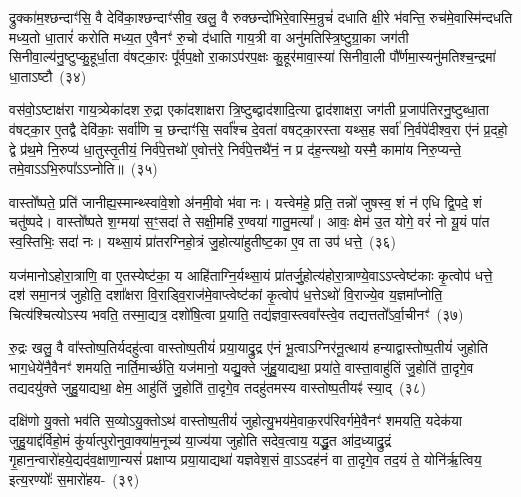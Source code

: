 द्रुक्का॑म॒श्छन्दाꣳ॑सि॒ वै देवि॑का॒श्छन्दाꣳ॑सीव॒ खलु॒ वै रुक्छन्दो॑भिरे॒वास्मि॒न्रुचं॑ दधाति क्षी॒रे भ॑वन्ति॒ रुच॑मे॒वास्मि॑न्दधति मध्य॒तो धा॒तारं॑ करोति मध्य॒त ए॒वैनꣳ॑ रु॒चो द॑धाति गाय॒त्री वा अनु॑मतिस्त्रि॒ष्टुग्रा॒का जग॑ती सिनीवा॒ल्य॑नु॒ष्टुप्कु॒हूर्धा॒ता व॑षट्का॒रः पू᳚र्वप॒क्षो रा॒का\-ऽप॑रप॒क्षः कु॒हूर॑मावा॒स्या॑ सिनीवा॒ली पौ᳚र्णमा॒स्यनु॑\-मतिश्च॒न्द्रमा॑ धा॒ता\-ऽष्टौ~(३४)

वस॑वो॒\-ऽष्टाक्ष॑रा गाय॒त्र्येका॑\-दश रु॒द्रा एका॑\-दशाक्षरा त्रि॒ष्टुब्द्वाद॑शादि॒त्या द्वाद॑शाक्षरा॒ जग॑ती प्र॒जा\-प॑तिरनु॒ष्टुब्धा॒ता व॑षट्का॒र ए॒तद्वै देवि॑काः॒ सर्वा॑णि च॒ छन्दाꣳ॑सि॒ सर्वा᳚श्च दे॒वता॑ वषट्का॒रस्ता यथ्स॒ह सर्वा॑ नि॒र्वपे॑दीश्व॒रा ए॑नं प्र॒दहो॒ द्वे प्र॑थ॒मे नि॒रुप्य॑ धा॒तुस्तृ॒तीयं॒ निर्व॑पे॒त्तथो॑ ए॒वोत्त॑रे॒ निर्व॑पे॒त्तथै॑नं॒ न प्र द॑ह॒न्त्यथो॒ यस्मै॒ कामा॑य निरु॒प्यन्ते॒ तमे॒वा\-ऽऽ\-भि॒रुपा᳚\-ऽऽ\-प्नोति॥~(३५)

{\anuvakamend[{प॒शुका॑म॒श्छन्दाꣳ॑सि॒ वै देवि॑का॒श्छन्दाꣳ॑सि॒ ग्राम॑ङ्कल्पयत्ये॒ता ए॒व निरु॑त्त॒मन्धा॒तारं॑ करोति मे॒धा न॑मत्ये॒ता ए॒व निर्व॑पेद॒ष्टौ द॑हन्ति॒ नव॑ च॥ देविकाः प्रजाकामो मिथुनी पशुकाम}]}

वास्तो᳚ष्पते॒ प्रति॑ जानीह्य॒स्मान्थ्\-स्वा॑वे॒शो अ॑नमी॒वो भ॑वा नः। यत्त्वेम॑हे॒ प्रति॒ तन्नो॑ जुषस्व॒ शं न॑ एधि द्वि॒पदे॒ शं चतु॑ष्पदे। वास्तो᳚ष्पते श॒ग्मया॑ स॒ꣳ॒सदा॑ ते सक्षी॒महि॑ र॒ण्वया॑ गातु॒मत्या᳚। आवः॒ क्षेम॑ उ॒त योगे॒ वरं॑ नो यू॒यं पा॑त स्व॒स्तिभिः॒ सदा॑ नः। यथ्सा॒यं प्रा॑तरग्निहो॒त्रं जु॒होत्या॑हुतीष्ट॒का ए॒व ता उप॑ धत्ते॒~(३६)

यज॑मानो\-ऽहोरा॒त्राणि॒ वा ए॒तस्येष्ट॑का॒ य आहि॑ताग्नि॒र्यथ्सा॒यं प्रा॑तर्जु॒होत्य॑होरा॒त्राण्ये॒वा\-ऽ\-ऽ\-प्त्वेष्ट॑काः कृ॒त्वोप॑ धत्ते॒ दश॑ समा॒नत्र॑ जुहोति॒ दशा᳚क्षरा वि॒राड्वि॒राज॑मे॒वाप्त्वेष्ट॑कां कृ॒त्वोप॑ ध॒त्ते\-ऽथो॑ वि॒राज्ये॒व य॒ज्ञमा᳚प्नोति॒ चित्य॑श्चित्यो\-ऽस्य भवति॒ तस्मा॒द्यत्र॒ दशो॑षि॒त्वा प्र॒याति॒ तद्य॑ज्ञवा॒स्त्ववा᳚स्त्वे॒व तद्यत्ततो᳚\-ऽर्वा॒चीनꣳ॑~(३७)

रु॒द्रः खलु॒ वै वा᳚स्तोष्प॒तिर्यदहु॑त्वा वास्तोष्प॒तीयं॑ प्रया॒याद्रु॒द्र ए॑नं भू॒त्वा\-ऽग्निर॑नू॒त्थाय॑ हन्याद्वास्तोष्प॒तीयं॑ जुहोति भाग॒धेये॑नै॒वैनꣳ॑ शमयति॒ नार्ति॒मार्च्छ॑ति॒ यज॑मानो॒ यद्यु॒क्ते जु॑हु॒याद्यथा॒ प्रया॑ते॒ वास्ता॒वाहु॑तिं जु॒होति॑ ता॒दृगे॒व तद्यदयु॑क्ते जुहु॒याद्यथा॒ क्षेम॒ आहु॑तिं जु॒होति॑ ता॒दृगे॒व तदहु॑तमस्य वास्तोष्प॒तीयꣴ॑ स्या॒द्~(३८)

दक्षि॑णो यु॒क्तो भव॑ति स॒व्यो\-ऽयु॒क्तो\-ऽथ॑ वास्तोष्प॒तीयं॑ जुहोत्यु॒भय॑मे॒वाक॒रप॑रिवर्गमे॒वैनꣳ॑ शमयति॒ यदेक॑या जुहु॒याद्द॑र्विहो॒मं कु॑र्यात्पुरोनुवा॒क्या॑म॒नूच्य॑ या॒ज्य॑या जुहोति सदेव॒त्वाय॒ यद्धु॒त आ॑द॒ध्याद्रु॒द्रं गृ॒हान॒न्वारो॑हये॒द्यद॑व॒\-क्षाणा॒न्यसं॑ प्रक्षाप्य प्रया॒याद्यथा॑ यज्ञवेश॒सं वा॒\-ऽऽ\-दह॑नं वा ता॒दृगे॒व तद॒यं ते॒ योनि॑र्\mbox{}ऋ॒त्विय॒ इत्य॒रण्योः᳚ स॒मारो॑हय-~(३९)

